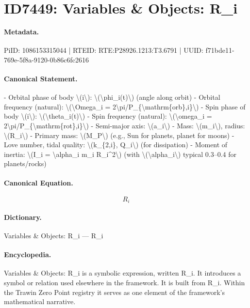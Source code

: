 \section*{ID7449: Variables \& Objects: R\_i}
\paragraph{Metadata.}
PiID: 1086153315044 | RTEID: RTE:P28926.1213:T3.6791 | UUID: f71bde11-769e-5f8a-9120-0b86c6fc2616

\paragraph{Canonical Statement.}
- Orbital phase of body \textbackslash{}(i\textbackslash{}): \textbackslash{}(\textbackslash{}phi\_i(t)\textbackslash{}) (angle along orbit) - Orbital frequency (natural): \textbackslash{}(\textbackslash{}Omega\_i = 2\textbackslash{}pi/P\_\{\textbackslash{}mathrm\{orb\},i\}\textbackslash{}) - Spin phase of body \textbackslash{}(i\textbackslash{}): \textbackslash{}(\textbackslash{}theta\_i(t)\textbackslash{}) - Spin frequency (natural): \textbackslash{}(\textbackslash{}omega\_i = 2\textbackslash{}pi/P\_\{\textbackslash{}mathrm\{rot\},i\}\textbackslash{}) - Semi-major axis: \textbackslash{}(a\_i\textbackslash{}) - Mass: \textbackslash{}(m\_i\textbackslash{}), radius: \textbackslash{}(R\_i\textbackslash{}) - Primary mass: \textbackslash{}(M\_P\textbackslash{}) (e.g., Sun for planets, planet for moons) - Love number, tidal quality: \textbackslash{}(k\_\{2,i\}, Q\_i\textbackslash{}) (for dissipation) - Moment of inertia: \textbackslash{}(I\_i = \textbackslash{}alpha\_i m\_i R\_i\textasciicircum{}2\textbackslash{}) (with \textbackslash{}(\textbackslash{}alpha\_i\textbackslash{}) typical 0.3–0.4 for planets/rocks)

\paragraph{Canonical Equation.}
\[
R_i
\]

\paragraph{Dictionary.}
Variables \& Objects: R\_i — R\_i

\paragraph{Encyclopedia.}
Variables \& Objects: R\_i is a symbolic expression, written R\_i. It introduces a symbol or relation used elsewhere in the framework. It is built from R\_i. Within the Trawin Zero Point registry it serves as one element of the framework's mathematical narrative.
